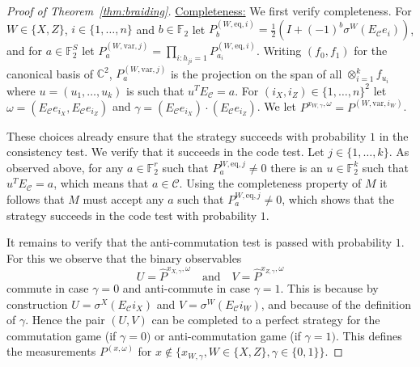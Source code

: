 \documentclass[11pt]{article}
\theoremstyle{definition}
\newcommand{\code}{\mathscr{C}}
\newcommand{\Id}{\ensuremath{I}}
\newcommand{\field}{\mathbb{F}_2}
\newcommand{\C}{\ensuremath{\mathbb{C}}}
\newcommand{\F}{\ensuremath{\mathbb{F}}}
\newcommand{\eq}{\mathrm{eq}}
\newcommand{\var}{\mathrm{var}}
\begin{document}
\begin{proof}[Proof of Theorem~\ref{thm:braiding}]
\underline{Completeness:} We first verify completeness. For $W\in\{X,Z\}$, $i\in\{1,\ldots,n\}$ and $b\in \F_2$ let $P^{(W,\eq,i)}_b = \frac{1}{2}(\Id + (-1)^b\sigma^W(E_\code e_i))$, and for $a\in \F_2^S$ let $P^{(W,\var,j)}_a = \prod_{i: h_{ji}=1} P^{(W,\eq,i)}_{a_i}$. Writing $(f_0,f_1)$ for the canonical basis of $\C^2$, $P^{(W,\var,j)}_a$ is the projection on the span of all $\otimes_{i=1}^k f_{u_i}$ where $u=(u_1,\ldots,u_k)$ is such that $u^T E_\code=a$.   
For $(i_X,i_Z)\in \{1,\ldots,n\}^2 $ let $\omega=(E_\code e_{i_X}, E_\code e_{i_Z})$ and $\gamma =(E_\code e_{i_X}) \cdot(E_\code e_{i_Z}) $. We let $P^{x_{W,\gamma},\omega} = P^{(W,\var,i_W)}$. 

These choices already ensure that the strategy succeeds with probability $1$ in the consistency test. We verify that it succeeds in the code test. Let $j\in\{1,\ldots,k\}$. As observed above, for any $a\in\field^r$ such that $P^{W,\eq,j}_a\neq 0$ there is an $u\in \field^k$ such that $u^TE_\code=a$, which means that $a\in \code$. 
Using the completeness property of $M$ it follows that $M$ must accept any $a$ such that $P^{W,\eq,j}_a\neq 0$, which shows that the strategy succeeds in the code test with probability $1$. 

It remains to verify that the anti-commutation test is passed with probability $1$. For this we observe that 
the binary observables 
\[ U=\widehat{ P}^{x_{X,\gamma},\omega} \quad\text{and}\quad V= \widehat{P}^{x_{Z,\gamma},\omega} \]
commute in case $\gamma=0$ and anti-commute in case $\gamma=1$. This is because by construction $U=\sigma^X(E_\code i_X)$ and $V=\sigma^W(E_\code i_W)$, and because of the definition of $\gamma$. Hence the pair $(U,V)$ can be completed to a perfect strategy for the commutation game (if $\gamma=0)$ or anti-commutation game (if $\gamma=1)$. This defines the measurements $P^{(x,\omega)}$ for $x\notin \{x_{W,\gamma},W\in\{X,Z\},\gamma\in\{0,1\}\}$. 

\bigskip 


\end{proof}
\end{document}
